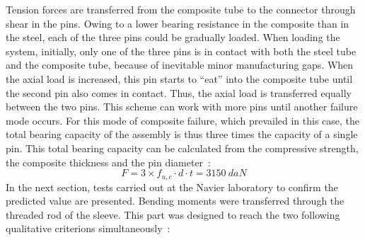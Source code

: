 Tension forces are transferred from the composite tube to the connector through shear in the pins. Owing to a lower bearing resistance in the composite than in the steel, each of the three pins could be gradually loaded. When loading the system, initially, only one of the three pins is in contact with both the steel tube and the composite tube, because of inevitable minor manufacturing gaps. When the axial load is increased, this pin starts to “eat” into the composite tube until the second pin also comes in contact. Thus, the axial load is transferred equally between the two pins. This scheme can work with more pins until another failure mode occurs.
For this mode of composite failure, which prevailed in this case, the total bearing capacity of the assembly is thus three times the capacity of a single pin. This total bearing capacity can be calculated from the compressive strength, the composite thickness and the pin diameter~:
\begin{equation}
	F = 3 \times f_{u,c}\cdot d \cdot t = \SI{3150}{daN}
\end{equation}
In the next section, tests carried out at the Navier laboratory to confirm the predicted value are presented.
Bending moments were transferred through the threaded rod of the sleeve. This part was designed to reach the two following qualitative criterions simultaneously~:
